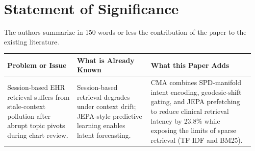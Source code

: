 \documentclass[12pt]{article}
\begin{document}
\section*{Statement of Significance}
\noindent
The authors summarize in 150 words or less the contribution of the paper to the existing literature.

\begin{table}[h]
\centering
\begin{tabular}{@{}p{}p{}p{}@{}}
\toprule
\textbf{Problem or Issue} & \textbf{What is Already Known} & \textbf{What this Paper Adds} \\
\midrule
Session-based EHR retrieval suffers from stale-context pollution after abrupt topic pivots during chart review. & Session-based retrieval degrades under context drift; JEPA-style predictive learning enables latent forecasting. & CMA combines SPD-manifold intent encoding, geodesic-shift gating, and JEPA prefetching to reduce clinical retrieval latency by 23.8\% while exposing the limits of sparse retrieval (TF-IDF and BM25). \\
\bottomrule
\end{tabular}
\end{table}
\end{document}
